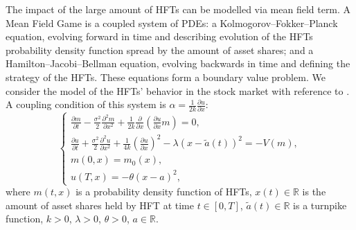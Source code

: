 \documentclass[12pt]{llncs}
\begin{document}
The impact of the large amount of HFTs can be modelled via mean field term. A Mean Field Game is a coupled system of PDEs: a Kolmogorov--Fokker--Planck equation, evolving forward in time and describing evolution of the HFTs probability density function spread by the amount of asset shares; and a Hamilton--Jacobi--Bellman equation, evolving backwards in time and defining the strategy of the HFTs. These equations form a boundary value problem. We consider the model of the HFTs' behavior in the stock market with reference to \cite{FatoneMarianiRecchioniZirilli}. A coupling condition of this system is 
$\alpha = \frac{1}{2k}\frac{\partial u}{\partial x}$:
\[
\begin{cases}
\frac{\partial m}{\partial t} - \frac{\sigma^2}{2}\frac{\partial^2 m}{\partial x^2} + \frac{1}{2k}\frac{\partial}{\partial x}\left(\frac{\partial u}{\partial x}m\right) = 0,\\
\frac{\partial u}{\partial t} + \frac{\sigma^2}{2}\frac{\partial^2 u}{\partial x^2} + \frac{1}{4k}\left(\frac{\partial u}{\partial x}\right)^2 - \lambda\left(x - \tilde{a}(t)\right)^2 = -V(m),\\
m(0,x) = m_0(x),\\
u(T,x)=-\theta(x-a)^2,
\end{cases}
\]
where $m(t,x)$ is a probability density function of HFTs, $x(t) \in \mathbb{R}$ is the amount of asset shares held by HFT at time $t \in [0,T]$,  $\tilde{a}(t) \in \mathbb{R}$ is a turnpike function, $k > 0$, $\lambda > 0$, $\theta > 0$, $a \in \mathbb{R}$. 
\end{document}
